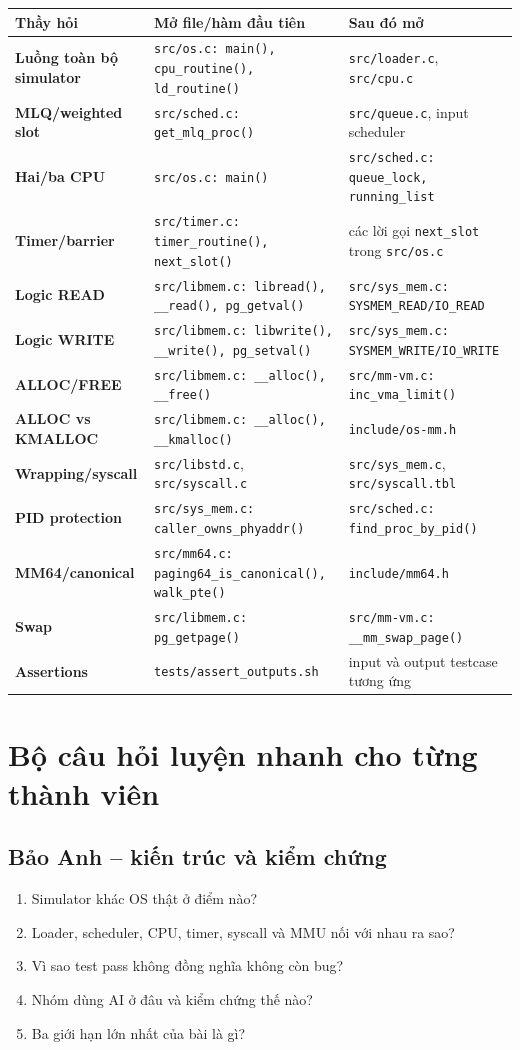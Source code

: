 \documentclass[11pt,a4paper]{article}
\newcommand{\code}[1]{\texttt{\color{navy}#1}}
\begin{document}
\begin{longtable}{>{\bfseries\color{navy}}p{4cm} p{5.3cm} p{5.8cm}}
\toprule
\textbf{Thầy hỏi} & \textbf{Mở file/hàm đầu tiên} & \textbf{Sau đó mở}\\
\midrule
\endhead
Luồng toàn bộ simulator & \code{src/os.c: main(), cpu\_routine(), ld\_routine()} &
\code{src/loader.c}, \code{src/cpu.c}\\
MLQ/weighted slot & \code{src/sched.c: get\_mlq\_proc()} &
\code{src/queue.c}, input scheduler\\
Hai/ba CPU & \code{src/os.c: main()} &
\code{src/sched.c: queue\_lock, running\_list}\\
Timer/barrier & \code{src/timer.c: timer\_routine(), next\_slot()} &
các lời gọi \code{next\_slot} trong \code{src/os.c}\\
Logic READ & \code{src/libmem.c: libread(), \_\_read(), pg\_getval()} &
\code{src/sys\_mem.c: SYSMEM\_READ/IO\_READ}\\
Logic WRITE & \code{src/libmem.c: libwrite(), \_\_write(), pg\_setval()} &
\code{src/sys\_mem.c: SYSMEM\_WRITE/IO\_WRITE}\\
ALLOC/FREE & \code{src/libmem.c: \_\_alloc(), \_\_free()} &
\code{src/mm-vm.c: inc\_vma\_limit()}\\
ALLOC vs KMALLOC & \code{src/libmem.c: \_\_alloc(), \_\_kmalloc()} &
\code{include/os-mm.h}\\
Wrapping/syscall & \code{src/libstd.c}, \code{src/syscall.c} &
\code{src/sys\_mem.c}, \code{src/syscall.tbl}\\
PID protection & \code{src/sys\_mem.c: caller\_owns\_phyaddr()} &
\code{src/sched.c: find\_proc\_by\_pid()}\\
MM64/canonical & \code{src/mm64.c: paging64\_is\_canonical(), walk\_pte()} &
\code{include/mm64.h}\\
Swap & \code{src/libmem.c: pg\_getpage()} &
\code{src/mm-vm.c: \_\_mm\_swap\_page()}\\
Assertions & \code{tests/assert\_outputs.sh} &
input và output testcase tương ứng\\
\bottomrule
\end{longtable}

\section{Bộ câu hỏi luyện nhanh cho từng thành viên}

\subsection{Bảo Anh -- kiến trúc và kiểm chứng}
\begin{enumerate}
  \item Simulator khác OS thật ở điểm nào?
  \item Loader, scheduler, CPU, timer, syscall và MMU nối với nhau ra sao?
  \item Vì sao test pass không đồng nghĩa không còn bug?
  \item Nhóm dùng AI ở đâu và kiểm chứng thế nào?
  \item Ba giới hạn lớn nhất của bài là gì?
\end{enumerate}
\end{document}
